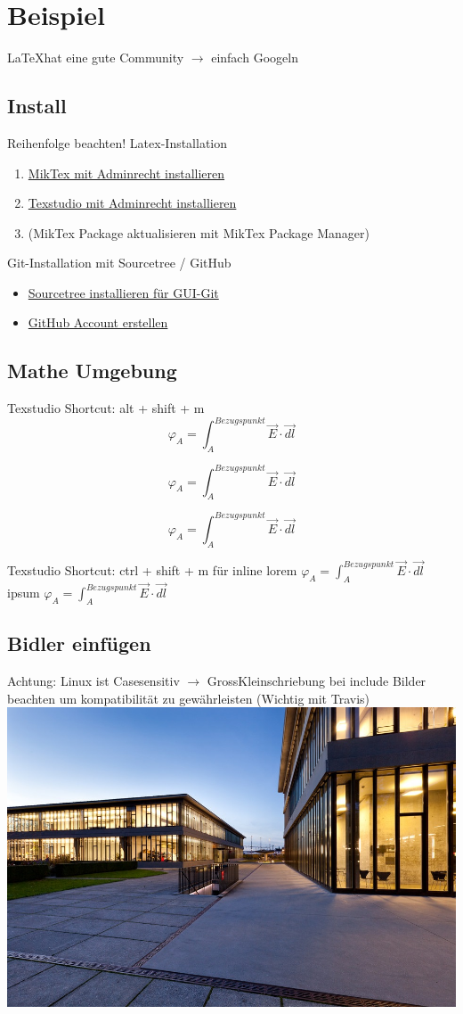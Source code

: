 \section*{Beispiel}
\LaTeX  hat eine gute Community $\rightarrow$ einfach Googeln\newline
\subsection{Install}
Reihenfolge beachten!\newline
Latex-Installation\newline
\begin{enumerate}
    \item \href{https://miktex.org/download}{MikTex mit Adminrecht installieren}
    \item \href{https://www.texstudio.org}{Texstudio mit Adminrecht installieren}
    \item (MikTex Package aktualisieren mit MikTex Package Manager)
\end{enumerate}

Git-Installation mit Sourcetree / GitHub\newline
\begin{itemize}
    \item \href{https://www.sourcetreeapp.com/}{Sourcetree installieren für GUI-Git}\item \href{https://www.github.com/}{GitHub Account erstellen}
\end{itemize}
\subsection{Mathe Umgebung}
Texstudio Shortcut: alt + shift + m
\[ \varphi_A = \int_{A}^{Bezugspunkt}\vec{E}\cdot\vec{dl} \]

\begin{equation*}
\varphi_A = \int_{A}^{Bezugspunkt}\vec{E}\cdot\vec{dl}
\end{equation*}


\begin{equation}
    \varphi_A = \int_{A}^{Bezugspunkt}\vec{E}\cdot\vec{dl}
\end{equation}

Texstudio Shortcut: ctrl + shift + m für inline \newline
lorem $ \varphi_A = \int_{A}^{Bezugspunkt}\vec{E}\cdot\vec{dl}$ ipsum $ \varphi_A = \int_{A}^{Bezugspunkt}\vec{E}\cdot\vec{dl}$

\subsection{Bidler einfügen}
Achtung: Linux ist Casesensitiv $\rightarrow$ GrossKleinschriebung bei include Bilder beachten um kompatibilität zu gewährleisten (Wichtig mit Travis)\newline
\includegraphics[width=0.1\linewidth]{images/HSR}

